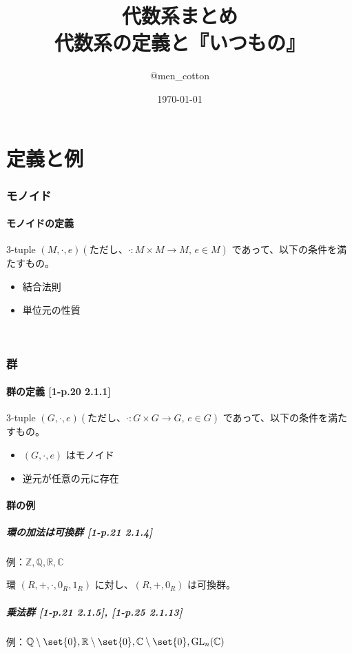 \documentclass[twocolumn]{jsarticle}
\title{代数系まとめ \\ 代数系の定義と『いつもの』}
\author{@men\_cotton}
\date{\today}
\newcommand{\Z}{\mathbb{Z}}
\newcommand{\R}{\mathbb{R}}
\newcommand{\C}{\mathbb{C}}
\begin{document}
\maketitle
\part*{定義と例}
\section{モノイド}
\subsection{モノイドの定義}
3-tuple \((M, \cdot, e) (ただし、\cdot\colon M \times M \to M,\, e \in M)\) であって、以下の条件を満たすもの。\\[-8mm]
\begin{itemize}
    \item 結合法則
    \item 単位元の性質
\end{itemize}
\:\\[-16mm]

\section{群}
\subsection{群の定義 [1-p.20 2.1.1]}
3-tuple \((G, \cdot, e) (ただし、\cdot\colon G \times G \to G,\, e \in G)\) であって、以下の条件を満たすもの。
\begin{itemize}
    \item \((G, \cdot, e)\) はモノイド
    \item 逆元が任意の元に存在
\end{itemize}

\subsection{群の例}
\subsubsection{環の加法は可換群 [1-p.21 2.1.4]}
例：\(\Z, \mathbb{Q}, \R, \C\)

環 \((R, +, \cdot, 0_R, 1_R)\) に対し、\((R, +, 0_R)\) は可換群。

\subsubsection{乗法群 [1-p.21 2.1.5], [1-p.25 2.1.13]}
例：\(\mathbb{Q}\setminus\set{0}, \R\setminus\set{0}, \C\setminus\set{0}, \mathrm{GL}_{n}(\C)\)
\end{document}

